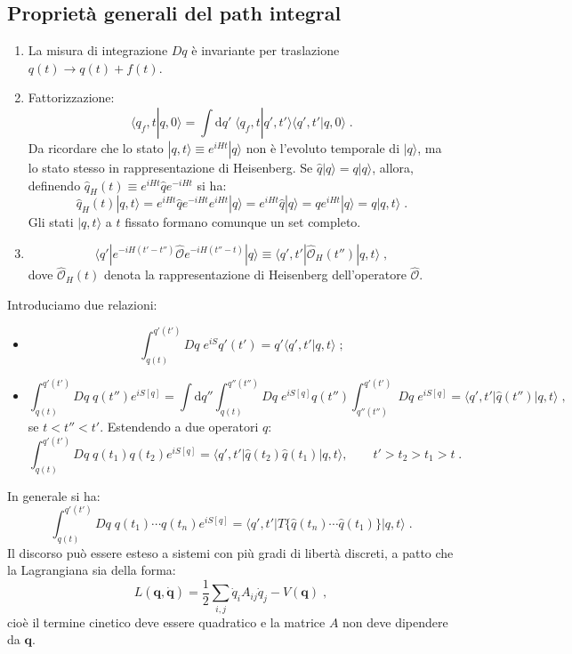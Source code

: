 \documentclass[12pt,a4paper]{article}
\theoremstyle{definition}
\numberwithin{equation}{section}
\newcommand{\diff}[1][]{\mathrm{d}#1}
\newcommand{\bra}{\langle}
\newcommand{\ket}{\rangle}
\begin{document}
\subsection{Proprietà generali del path integral}
\begin{enumerate}
\item La misura di integrazione $Dq$ è invariante per traslazione $q(t)\to q(t)+f(t)$.
\item Fattorizzazione:
$$
\bra q_f,t|q,0\ket=\int\diff{q'}\;\bra q_f,t|q',t'\ket\bra q',t'|q,0\ket\;.
$$
Da ricordare che lo stato $|q,t\ket\equiv e^{iHt}|q\ket$ non è l'evoluto temporale di $|q\ket$, ma lo stato stesso in rappresentazione di Heisenberg. Se $\hat{q}|q\ket=q|q\ket$, allora, definendo $\hat{q}_H(t)\equiv e^{iHt}\hat{q}e^{-iHt}$ si ha:
$$
\hat{q}_H(t)|q,t\ket=e^{iHt}\hat{q}e^{-iHt}e^{iHt}|q\ket=e^{iHt}\hat{q}|q\ket=qe^{iHt}|q\ket=q|q,t\ket\;.
$$
Gli stati $|q,t\ket$ a $t$ fissato formano comunque un set completo.
\item
$$
\bra q'|e^{-iH(t'-t'')}\hat{\mathcal{O}}e^{-iH(t''-t)}|q\ket\equiv \bra q',t'|\hat{\mathcal{O}}_H(t'')|q,t\ket\;,
$$
dove $\hat{\mathcal{O}}_H(t)$ denota la rappresentazione di Heisenberg dell'operatore $\hat{\mathcal{O}}$.
\end{enumerate}
Introduciamo due relazioni:
\begin{itemize}
\item \begin{equation}
\int_{q(t)}^{q'(t')}Dq\; e^{iS}q'(t')=q'\bra q',t'|q,t\ket\;;
\end{equation}
\item \begin{equation}
\int_{q(t)}^{q'(t')}Dq\; q(t'')e^{iS[q]}=\int\diff{q''}\int_{q(t)}^{q''(t'')}Dq\; e^{iS[q]}q(t'')\int_{q''(t'')}^{q'(t')}Dq\; e^{iS[q]}=\bra q',t'|\hat{q}(t'')|q,t\ket\;,
\end{equation}
se $t<t''<t'$. Estendendo a due operatori $q$:
\begin{equation*}
\int_{q(t)}^{q'(t')}Dq\; q(t_1)q(t_2)e^{iS[q]}=\bra q',t'|\hat{q}(t_2)\hat{q}(t_1)|q,t\ket,\qquad t'>t_2>t_1>t\;.
\end{equation*}
\end{itemize}
In generale si ha:
\begin{equation}
\boxed{
\int_{q(t)}^{q'(t')}Dq\; q(t_1)\cdots q(t_n)e^{iS[q]}=\bra q',t'|T\{\hat{q}(t_n)\cdots \hat{q}(t_1)\}|q,t\ket
}\;.
\end{equation}
Il discorso può essere esteso a sistemi con più gradi di libertà discreti, a patto che la Lagrangiana sia della forma:
\begin{equation}
L(\mathbf{q},\dot{\mathbf{q}})=\frac{1}{2}\sum_{i,j}\dot{q}_iA_{ij}\dot{q}_j-V(\mathbf{q})\;,
\end{equation}
cioè il termine cinetico deve essere quadratico e la matrice $A$ non deve dipendere da $\mathbf{q}$.
\end{document}
